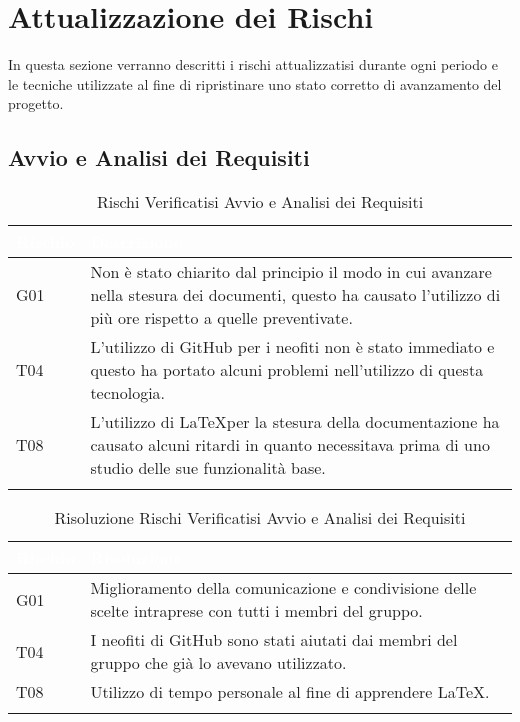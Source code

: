 \section{Attualizzazione dei Rischi}
\label{AR}

In questa sezione verranno descritti i rischi attualizzatisi durante ogni periodo e le tecniche utilizzate al fine di ripristinare uno stato corretto di avanzamento del progetto.


\subsection{Avvio e Analisi dei Requisiti}\label{ARAvvioAnalisi}

\begin{longtable}{|C{.15\textwidth}|C{.79\textwidth}|}
\hline
{}\textbf{\textcolor{white}{Rischio}} & \textbf{\textcolor{white}{Descrizione}} \\
\hline \hline
\endfirsthead
G01 & Non è stato chiarito dal principio il modo in cui avanzare nella stesura dei documenti, questo ha causato l'utilizzo di più ore rispetto a quelle preventivate.\\ 
\hline
{}T04 &  L'utilizzo di GitHub per i neofiti non è stato immediato e questo ha portato alcuni problemi nell'utilizzo di questa tecnologia. \\
\hline
T08 & L'utilizzo di \LaTeX per la stesura della documentazione ha causato alcuni ritardi in quanto necessitava prima di uno studio delle sue funzionalità base. \\
\hline

\caption{Rischi Verificatisi Avvio e Analisi dei Requisiti}
\label{tab:rischiVerificatisiAvvioAnalisi}
\end{longtable}

\begin{longtable}{|C{.15\textwidth}|C{.79\textwidth}|}
\hline
{}\textbf{\textcolor{white}{Rischio}} & \textbf{\textcolor{white}{Risoluzione}} \\
\hline \hline
\endfirsthead
G01 & Miglioramento della comunicazione e condivisione delle scelte intraprese con tutti i membri del gruppo.\\ 
\hline
{}T04 & I neofiti di GitHub sono stati aiutati dai membri del gruppo che già lo avevano utilizzato. \\
\hline
T08 & Utilizzo di tempo personale al fine di apprendere \LaTeX. \\
\hline

\caption{Risoluzione Rischi Verificatisi Avvio e Analisi dei Requisiti}
\label{tab:risoluzioneRischiAvvioAnalisi}
\end{longtable}
\pagebreak

